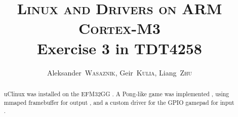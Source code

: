 \documentclass[a4,journal,twoside]{IEEEtran}
\title{
    \textsc{Linux and Drivers on ARM Cortex-M3}\\
    Exercise 3 in TDT4258
}
\author{
    Aleksander~\textsc{Wasaznik},
    Geir~\textsc{Kulia},
    Liang~\textsc{Zhu}
}
\begin{document}
\maketitle

\begin{abstract}
uClinux was installed on the EFM32GG
.
A Pong-like game was implemented
, using mmaped framebuffer for output
, and a custom driver for the GPIO gamepad for input
.
\end{abstract}




\end{document}
